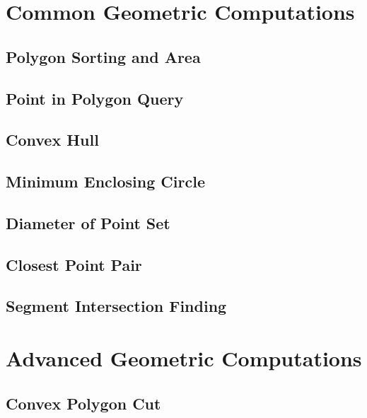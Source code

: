 \section{Common Geometric Computations}
\setcounter{section}{3}
\setcounter{subsection}{0}
\subsection{Polygon Sorting and Area}

\subsection{Point in Polygon Query}

\subsection{Convex Hull}

\subsection{Minimum Enclosing Circle}

\subsection{Diameter of Point Set}

\subsection{Closest Point Pair}

\subsection{Segment Intersection Finding}


\section{Advanced Geometric Computations}
\setcounter{section}{4}
\setcounter{subsection}{0}
\subsection{Convex Polygon Cut}

